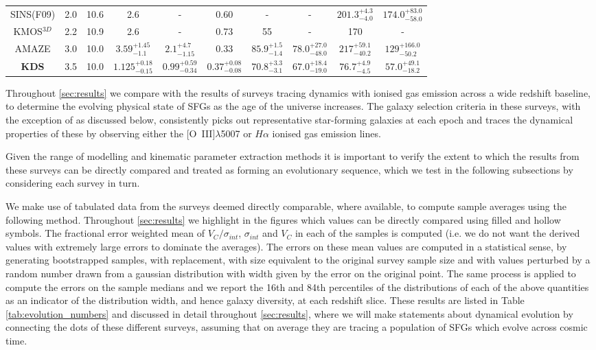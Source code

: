 \documentclass[fleqn,usenatbib]{mn2e}
\begin{document}
\begin{table*}
\begin{threeparttable}
\begin{tabular}{c c c c c c c c c c }
 SINS(F09) & 2.0 & 10.6 & 2.6 & - & 0.60 & - & - & $201.3^{+4.3}_{-4.0}$ & $174.0^{+83.0}_{-58.0}$ \\
 KMOS$^{3D}$ & 2.2 & 10.9 & 2.6 & - & 0.73 & 55 & - & 170 & - \\
 AMAZE & 3.0 & 10.0 & $3.59^{+1.45}_{-1.1}$ & $2.1^{+4.7}_{-1.15}$ & 0.33 & $85.9^{+1.5}_{-1.4}$ & $78.0^{+27.0}_{-48.0}$ & $217^{+59.1}_{-40.2}$ & $129^{+166.0}_{-50.2}$ \\
 \textbf{KDS} & 3.5 & 10.0 & $1.125^{+0.18}_{-0.15}$ & $0.99^{+0.59}_{-0.34}$ & $0.37^{+0.08}_{-0.08}$ & $70.8^{+3.3}_{-3.1}$ & $67.0^{+18.4}_{-19.0}$ & $76.7^{+4.9}_{-4.5}$ & $57.0^{+49.1}_{-18.2}$ \\
 \hline
\end{tabular}
  \end{threeparttable}
  \end{table*}

Throughout \cref{sec:results} we compare with the results of surveys tracing dynamics with ionised gas emission across a wide redshift baseline, to determine the evolving physical state of SFGs as the age of the universe increases.
The galaxy selection criteria in these surveys, with the exception of \cite{Green2014} as discussed below, consistently picks out representative star-forming galaxies at each epoch and traces the dynamical properties of these by observing either the [O~{\sc III}]$\lambda$5007 or $H\alpha$ ionised gas emission lines.

Given the range of modelling and kinematic parameter extraction methods it is important to verify the extent to which the results from these surveys can be directly compared and treated as forming an evolutionary sequence, which we test in the following subsections by considering each survey in turn.

We make use of tabulated data from the surveys deemed directly comparable, where available, to compute sample averages using the following method. 
Throughout \cref{sec:results} we highlight in the figures which values can be directly compared using filled and hollow symbols.
The fractional error weighted mean of $V_{C}/\sigma_{int}$, $\sigma_{int}$ and $V_{C}$ in each of the samples is computed (i.e. we do not want the derived values with extremely large errors to dominate the averages).
The errors on these mean values are computed in a statistical sense, by generating bootstrapped samples, with replacement, with size equivalent to the original survey sample size and with values perturbed by a random number drawn from a gaussian distribution with width given by the error on the original point.
The same process is applied to compute the errors on the sample medians and we report the 16th and 84th percentiles of the distributions of each of the above quantities as an indicator of the distribution width, and hence galaxy diversity, at each redshift slice.
These results are listed in Table \ref{tab:evolution_numbers} and discussed in detail throughout \cref{sec:results}, where we will make statements about dynamical evolution by connecting the dots of these different surveys, assuming that on average they are tracing a population of SFGs which evolve across cosmic time. 
\end{document}

